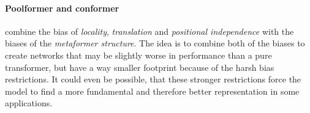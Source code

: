 \paragraph{Poolformer and conformer} \cite{metaformerPaper} combine the bias of \emph{locality}, \emph{translation} and \emph{positional independence} with the biases of the \emph{metaformer structure}.
The idea is to combine both of the biases to create networks that may be slightly worse in performance than a pure transformer, but have a way smaller footprint because of the harsh bias restrictions. 
It could even be possible, that these stronger restrictions force the model to find a more fundamental and therefore better representation in some applications.
